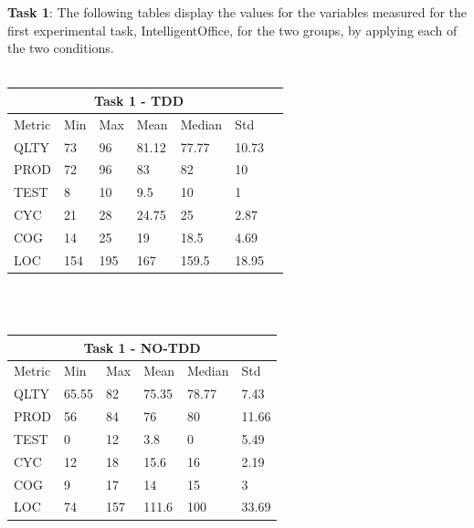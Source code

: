 \noindent\textbf{Task 1}: The following tables display the values for the variables measured for the first experimental task, IntelligentOffice, for the two groups, by applying each of the two conditions.
\\ \  \\
\noindent
\begin{tabular}{ |p{2cm}||p{1.6cm}|p{1.6cm}|p{1.6cm}|p{1.6cm}|p{1.6cm}|p{1.6cm}| }
    \hline
        \multicolumn{6}{|c|}{Task 1 - TDD} \\
    \hline
        Metric & Min & Max & Mean & Median & Std \\
    \hline
        QLTY & 73 & 96 & 81.12 & 77.77 & 10.73 \\
        PROD & 72 & 96 & 83 & 82 & 10 \\
        TEST & 8 & 10 & 9.5 & 10 & 1 \\
        CYC & 21 & 28 & 24.75 & 25 & 2.87 \\
        COG & 14 & 25 & 19 & 18.5 & 4.69 \\
        LOC & 154 & 195 & 167 & 159.5 & 18.95 \\
    \hline
\end{tabular}
\\ \  \\
\noindent
\begin{tabular}{ |p{2cm}||p{1.6cm}|p{1.6cm}|p{1.6cm}|p{1.6cm}|p{1.6cm}|}
    \hline
        \multicolumn{6}{|c|}{Task 1 - NO-TDD} \\
    \hline
        Metric & Min & Max & Mean & Median & Std\\
    \hline
        QLTY & 65.55 & 82 & 75.35 & 78.77 & 7.43 \\
        PROD & 56 & 84 & 76 & 80 & 11.66 \\
        TEST & 0 & 12 & 3.8 & 0 & 5.49 \\
        CYC & 12 & 18 & 15.6 & 16 & 2.19 \\
        COG & 9 & 17 & 14 & 15 & 3 \\
        LOC & 74 & 157 & 111.6 & 100 & 33.69 \\
    \hline
\end{tabular}
\\ \  \\

